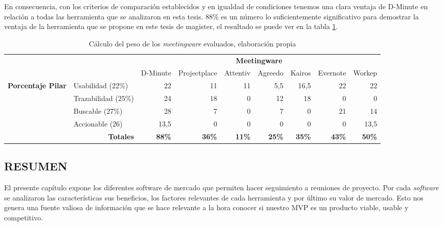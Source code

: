 En consecuencia, con los criterios de comparación establecidos y en igualdad de condiciones tenemos una clara ventaja de D-Minute en relación a todas las herramienta que se analizaron en esta tesis. 88\% es un número lo suficientemente significativo para demostrar la ventaja de la herramienta que se propone en este tesis de magister, el resultado se puede ver en la tabla \ref{tab:evaluacionfinal}.

\begin{table}[!h]
\centering
\caption{Cálculo del peso de los \textit{meetingware} evaluados, elaboración propia}
\label{tab:evaluacionfinal}
\resizebox{15cm}{!} {
\begin{tabular}{cl|r|r|r|r|r|r|r|}
\cline{3-9}
\multicolumn{1}{l}{} &  & \multicolumn{7}{c|}{\textbf{Meetingware}} \\ \cline{3-9} 
\multicolumn{1}{l}{} & \multicolumn{1}{c|}{} & \multicolumn{1}{c|}{D-Minute} & \multicolumn{1}{c|}{Projectplace} & \multicolumn{1}{c|}{Attentiv} & \multicolumn{1}{c|}{Agreedo} & \multicolumn{1}{c|}{Kairos} & \multicolumn{1}{c|}{Evernote} & \multicolumn{1}{c|}{Workep} \\ \hline
\multicolumn{1}{|c|}{\multirow{4}{*}{\textbf{Porcentaje Pilar}}} & Usabilidad (22\%) & 22 & 11 & 11 & 5,5 & 16,5 & 22 & 22 \\ \cline{2-9} 
\multicolumn{1}{|c|}{} & Trazabilidad (25\%) & 24 & 18 & 0 & 12 & 18 & 0 & 0 \\ \cline{2-9} 
\multicolumn{1}{|c|}{} & Buscable (27\%) & 28 & 7 & 0 & 7 & 0 & 21 & 14 \\ \cline{2-9} 
\multicolumn{1}{|c|}{} & Accionable (26) & 13,5 & 0 & 0 & 0 & 0 & 0 & 13,5 \\ \hline
\multicolumn{2}{|r|}{\textbf{Totales}} & \textbf{88\%} & \textbf{36\%} & \textbf{11\%} & \textbf{25\%} & \textbf{35\%} & \textbf{43\%} & \textbf{50\%} \\ \hline
\end{tabular}

}
\end{table}


\subsection{RESUMEN}

El presente capítulo expone los diferentes software de mercado que permiten hacer seguimiento a reuniones de proyecto. Por cada \textit{software} se analizaron las características sus beneficios, los factores relevantes de cada herramienta y por último su valor de mercado. Esto nos genera una fuente valiosa de información que se hace relevante a la hora conocer si nuestro MVP es un producto viable, usable y competitivo. 

